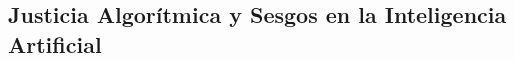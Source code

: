 \begin{refsection}
\chapter{Justicia Algorítmica y Sesgos en la Inteligencia Artificial}
\label{chapter:chapter-4}


\begin{comment}
\begin{enumerate}
\item \textbf{Justicia Algorítmica y Sesgos en la Inteligencia Artificial (Capítulo 4):}  
\begin{itemize}
    \item Contexto de los sesgos algorítmicos y sus impactos en justicia, educación y salud.
    \item Métodos para detectar y mitigar sesgos con herramientas como \texttt{Fairlearn}.
    \item Integración de interpretabilidad para garantizar transparencia en decisiones algorítmicas.
    \item Actividad: Implementar un pipeline de mitigación de sesgos en un modelo de clasificación con Python.
\end{itemize}
\end{enumerate}
\end{comment}



\nocite{*}

\printbibliography[heading=subbibliography, title={Bibliografía del Capítulo 4}]
\end{refsection}
